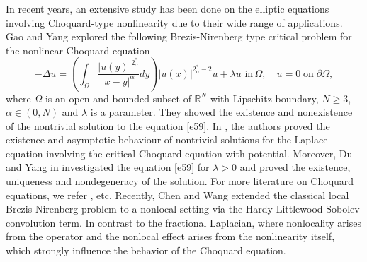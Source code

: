 \documentclass[reqno]{amsart}
\newcommand{\DD} {\displaystyle}
\newcommand{\la} {\lambda}
\newcommand{\Om}{\Omega}
\newcommand{\al} {\alpha}
\newcommand{\noi} {  \noindent}
\newcommand{\mb} {\mathbb}
\numberwithin{theorem}{section} \numberwithin{equation}{section}
\begin{document}
\noi In recent years, an extensive study has been done on the elliptic equations involving Choquard-type nonlinearity due to their wide range of applications. 
Gao and Yang \cite{37article} 
explored the following Brezis-Nirenberg type critical problem for the nonlinear Choquard equation
\begin{equation}\label{e59}
    -\Delta u = \left(\DD\int_{\Om}\frac{|u(y)|^{2_{\al}^{*}}}{|x-y|^{\al}}dy\right)  {|u(x)|^{2_{\al}^{*}-2} u}+ \la u \text{ in} \, \Om, \quad u=0\;\mbox{on}\;\partial \Om,
\end{equation}
where 
 $\Om$ is an open and bounded subset of $\mb{R}^N$ with Lipschitz boundary, $N\geq3$, $\al \in (0,N)$ and $\la$ is a parameter. They showed the existence and nonexistence of the nontrivial solution to the equation \eqref{e59}. In  \cite{45article}, the authors proved the existence and asymptotic behaviour of nontrivial solutions for the Laplace equation involving the critical Choquard equation with potential. Moreover, Du and Yang in \cite{44Du2019UniquenessAN} investigated the equation \eqref{e59} for $\la>0$  and proved the existence, uniqueness and nondegeneracy of the solution. For more literature on
Choquard equations, we refer \cite{46battaglia2017existence,47gao2020existence,48gao2020existence}, etc.
Recently, Chen and Wang \cite{49chen2026multiple} extended the classical local Brezis-Nirenberg problem to a nonlocal setting via the Hardy-Littlewood-Sobolev convolution term. In contrast to the fractional Laplacian, where nonlocality arises from the operator and the nonlocal effect arises from the nonlinearity itself, which strongly influence the behavior of the Choquard equation.
\end{document}

